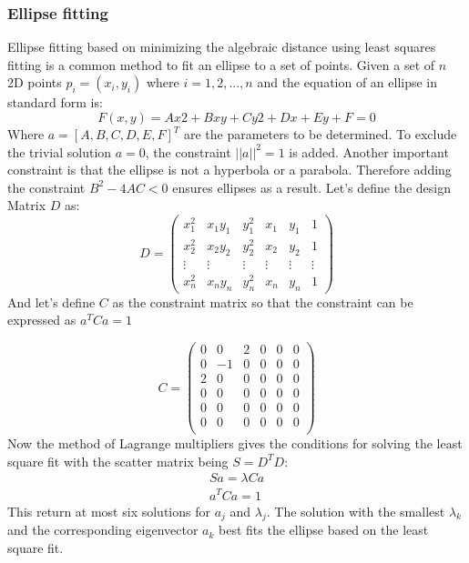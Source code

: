     \subsubsection{Ellipse fitting}
    \label{subsubsec:ellipsefitting}
    Ellipse fitting \cite{fitzgibbon_direct_2000} based on minimizing the algebraic distance using least squares fitting is a common method to fit an ellipse to a set of points. Given a set of $n$ 2D points $p_i = (x_i, y_i)$ where $i = 1,2,...,n$ and the equation of an ellipse in standard form is: 
    \begin{equation}
        F(x,y)=Ax2+Bxy+Cy2+Dx+Ey+F=0
        \label{eq:ellipse_standard}
    \end{equation}
    Where $a=[A, B, C, D, E, F]^T$ are the parameters to be determined. To exclude the trivial solution $a=0$, the constraint $||a||^2=1$ is added. Another important constraint is that the ellipse is not a hyperbola or a parabola. Therefore adding the constraint $B^2-4AC<0$ ensures ellipses as a result.
    Let's define the design Matrix $D$ as: 
    \begin{equation}
        D = \begin{pmatrix}
        x_1^2 & x_1y_1 & y_1^2 & x_1 & y_1 & 1 \\
        x_2^2 & x_2y_2 & y_2^2 & x_2 & y_2 & 1 \\
        \vdots & \vdots & \vdots & \vdots & \vdots & \vdots \\
        x_n^2 & x_ny_n & y_n^2 & x_n & y_n & 1 
        \end{pmatrix}
        \label{DesignMatrix}
        \end{equation}
    And let's define $C$ as the constraint matrix so that the constraint can be expressed as $a^TCa=1$

        \begin{equation}
            C = \begin{pmatrix}
            0 & 0 & 2 & 0 & 0 & 0 \\
            0 & -1 & 0 & 0 & 0 & 0 \\
            2 & 0 & 0 & 0 & 0 & 0 \\
            0 & 0 & 0 & 0 & 0 & 0 \\
            0 & 0 & 0 & 0 & 0 & 0 \\
            0 & 0 & 0 & 0 & 0 & 0 \\
            \end{pmatrix} \label{eq:C}
        \end{equation}
Now the method of Lagrange multipliers \cite{gander_least_1980} gives the conditions for solving the least square fit with the scatter matrix being $S=D^TD$: 
\begin{gather}
    Sa = \lambda Ca \\
    a^TCa=1
\end{gather}
This return at most six solutions for $a_j$ and $\lambda_j$. The solution with the smallest $\lambda_k$ and the corresponding eigenvector $a_k$ best fits the ellipse based on the least square fit. 

